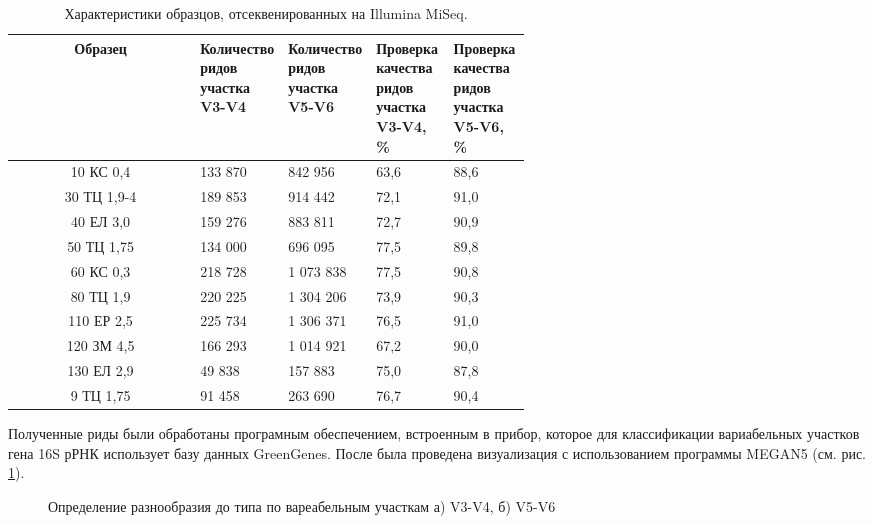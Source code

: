\begin{table}[h]
\caption{Характеристики образцов, отсеквенированных на Illumina MiSeq.}\label{tab:16Sread_Ill_characteristic}
\begin{center}
\begin{tabular}{|c|p{0.15\linewidth}|p{0.15\linewidth}|p{0.15\linewidth}|p{0.15\linewidth}|}
\hline
Образец & Количество ридов участка V3-V4 & Количество ридов участка V5-V6 & Проверка качества ридов участка V3-V4, \% & Проверка качества ридов участка V5-V6, \% \\
\hline
10 КС 0,4 &                                                                                                                                                                                                                                                                                                                                                                                                                                                                                                                                                                        133 870 & 842 956 & 63,6 & 88,6  \\
30 ТЦ 1,9-4 & 189 853 & 914 442 & 72,1  & 91,0  \\
40 ЕЛ 3,0 & 159 276 & 883 811 & 72,7  & 90,9  \\
50 ТЦ 1,75 & 134 000 & 696 095 & 77,5  & 89,8  \\
60 КС 0,3 & 218 728 & 1 073 838 & 77,5  & 90,8  \\
80 ТЦ 1,9 & 220 225 & 1 304 206 & 73,9  & 90,3  \\
110 ЕР 2,5 & 225 734 & 1 306 371 & 76,5  & 91,0  \\
120 ЗМ 4,5 & 166 293 & 1 014 921 & 67,2  & 90,0  \\
130 ЕЛ 2,9 & 49 838 & 157 883 & 75,0  & 87,8  \\
9 ТЦ 1,75 & 91 458 & 263 690 & 76,7  & 90,4  \\
\hline
\end{tabular}
\end{center}
\end{table}

Полученные риды были обработаны програмным обеспечением, встроенным в прибор, которое для классификации вариабельных участков гена 16S рРНК использует базу данных GreenGenes. После была проведена визуализация с использованием программы MEGAN5 (см. рис. \ref{ris:V3-V4, V5-V6}). 

\begin{figure}[h]
\begin{minipage}[h]{0.5\linewidth}
\end{minipage}
\hfill
\begin{minipage}[h]{0.5\linewidth}
\end{minipage}
\caption{Определение разнообразия до типа по вареабельным участкам а) V3-V4, б) V5-V6}
\label{ris:V3-V4, V5-V6}
\end{figure}

